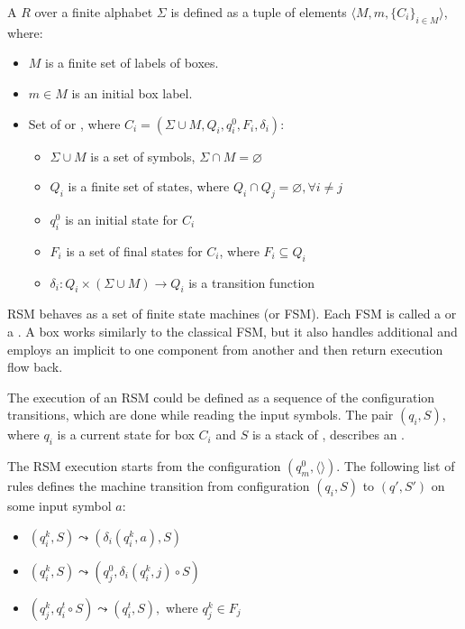 \begin{definition}
A  $R$ over a finite alphabet $\Sigma$ is defined as a tuple of elements $\langle M,m,\{C_i\}_{i \in M} \rangle$, where:

\begin{itemize}
    \item $M$ is a finite set of labels of boxes.
    \item $m \in M$ is an initial box label.
    \item Set of  or ,
          where $C_i=(\Sigma \cup M, Q_i,q_i^0,F_i,\delta_i)$:
    \begin{itemize}
        \item $\Sigma \cup M$ is a set of symbols, $\Sigma \cap M = \varnothing$
        \item $Q_i$ is a finite set of states,
              where $Q_i \cap Q_j =  \varnothing, \forall i \neq j$
        \item $q_i^0$ is an initial state for $C_i$
        \item $F_i$ is a set of final states for $C_i$, where $F_i \subseteq Q_i$
        \item $\delta_i: Q_i \times (\Sigma \cup M) \to Q_i$ is a transition function %
    \end{itemize}
\end{itemize}

\end{definition}

RSM behaves as a set of finite state machines (or FSM).
Each FSM is called a  or a .
A box works similarly to the classical FSM, but it also handles additional  and employs an implicit  to  one component from another and then return execution flow back.

The execution of an RSM could be defined as a sequence of the configuration transitions, which are done while reading the input symbols.
The pair $(q_i,S)$, where $q_i$ is a current state for box $C_i$ and $S$ is  a stack of , describes an .

The RSM execution starts from the configuration $(q_m^0, \langle\rangle)$.
The following list of rules defines the machine transition from configuration $(q_i,S)$ to $(q',S')$ on some input symbol $a$:

\begin{itemize}
    \item $(q_i^k,S) \leadsto (\delta_i (q_i^k, a),S)$
    \item $(q_i^k,S) \leadsto (q_j^0, \delta_i (q_i^k, j) \circ S)$
    \item $(q_j^k,q_i^t\circ S) \leadsto (q_i^t, S),$ where $q_j^k \in F_j$ 
\end{itemize}

